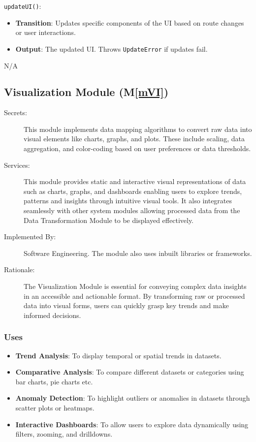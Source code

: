 \documentclass[12pt, titlepage]{article}
\newcommand{\mref}[1]{M\ref{#1}}
\begin{document}
\begin{description}
\begin{description}
  \item \texttt{updateUI()}:
  \begin{itemize}
    \item \textbf{Transition}: Updates specific components of the UI based on route changes or user interactions.
    \item \textbf{Output}: The updated UI. Throws \texttt{UpdateError} if updates fail.
  \end{itemize}
  
  \item[Local Function:] N/A
\end{description}

\subsection{Visualization Module (\mref{mVI})}
\begin{description}
  \item[Secrets:] This module implements data mapping algorithms to convert raw data into visual 
  elements like charts, graphs, and plots. These include scaling, data aggregation, and color-coding 
  based on user preferences or data thresholds.
  \item[Services:] This module provides static and interactive visual representations of data such as 
  charts, graphs, and dashboards enabling users to explore trends, patterns and insights through intuitive 
  visual tools. It also integrates seamlessly with other system modules allowing processed data from 
  the Data Transformation Module to be displayed effectively.
  \item[Implemented By:] Software Engineering. The module also uses inbuilt libraries or frameworks.
  \item[Rationale:] The Visualization Module is essential for conveying complex data insights in an 
  accessible and actionable format. By transforming raw or processed data into visual forms, users can 
  quickly grasp key trends and make informed decisions.
\end{description}

\subsubsection{Uses}
\begin{itemize}
  \item \textbf{Trend Analysis}: To display temporal or spatial trends in datasets.
  \item \textbf{Comparative Analysis}: To compare different datasets or categories using 
  bar charts, pie charts etc.
  \item \textbf{Anomaly Detection}: To highlight outliers or anomalies in datasets through scatter 
  plots or heatmaps.
  \item \textbf{Interactive Dashboards}: To allow users to explore data dynamically using filters, 
  zooming, and drilldowns.
\end{itemize}


\end{description}
\end{document}
